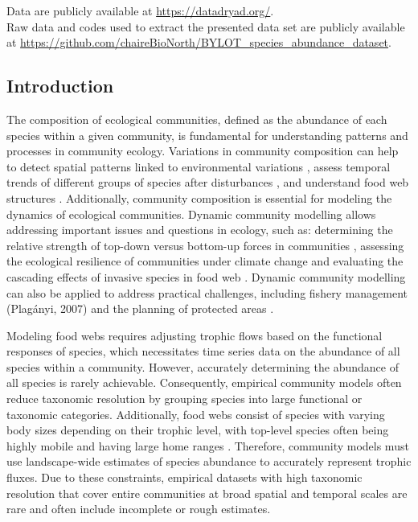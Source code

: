 \documentclass[a4paper,twoside,10pt]{article}
\begin{document}
Data are publicly available at \url{https://datadryad.org/}.\\[1.5em]
Raw data and codes used to extract the presented data set are publicly available at \url{https://github.com/chaireBioNorth/BYLOT_species_abundance_dataset}.
\endgroup
\newpage


\subsection*{Introduction}
 The composition of ecological communities, defined as the abundance of each species within a given community, is fundamental for understanding patterns and processes in community ecology. Variations in community composition can help to detect spatial patterns linked to environmental variations \citep{kemp1990}, assess temporal trends of different groups of species after disturbances \citep{philippi1998, magurran2007}, and understand food web structures \citep{cohen2003}. Additionally, community composition is essential for modeling the dynamics of ecological communities. Dynamic community modelling allows addressing important issues and questions in ecology, such as: determining the relative strength of top-down versus bottom-up forces in communities \citep{krebs2003,legagneux2014}, assessing the ecological resilience of communities under climate change \citep{griffith2019} and evaluating the cascading effects of invasive species in food web \citep{david2017, goto2020}. Dynamic community modelling can also be applied to address practical challenges, including fishery management (Plagányi, 2007) and the planning of protected areas \citep{okey2004, dahood2020}. 

Modeling food webs requires adjusting trophic flows based on the functional responses of species, which necessitates time series data on the abundance of all species within a community. However, accurately determining the abundance of all species is rarely achievable. Consequently, empirical community models often reduce taxonomic resolution by grouping species into large functional or taxonomic categories. Additionally, food webs consist of species with varying body sizes depending on their trophic level, with top-level species often being highly mobile and having large home ranges \citep{mccann2005}. Therefore, community models must use landscape-wide estimates of species abundance to accurately represent trophic fluxes. Due to these constraints, empirical datasets with high taxonomic resolution that cover entire communities at broad spatial and temporal scales are rare and often include incomplete or rough estimates.
\end{document}
